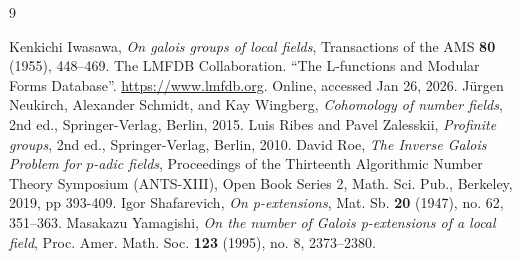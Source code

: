 \documentclass{amsart}
\begin{document}
\begin{thebibliography}{9}

 Kenkichi Iwasawa, \textit{On galois groups of local fields}, Transactions of the AMS \textbf{80} (1955), 448--469.
 The LMFDB Collaboration. ``The L-functions and Modular Forms
Database''. \url{https://www.lmfdb.org}.  Online, accessed Jan 26, 2026.
 J\"urgen Neukirch, Alexander Schmidt, and Kay Wingberg, \textit{Cohomology of number fields}, 2nd ed., Springer-Verlag, Berlin, 2015.
 Luis Ribes and Pavel Zalesskii, \textit{Profinite groups}, 2nd ed., Springer-Verlag, Berlin, 2010.
 David Roe, \textit{The Inverse Galois Problem for $p$-adic fields}, Proceedings of the Thirteenth Algorithmic Number Theory Symposium (ANTS-XIII), Open Book Series 2, Math. Sci. Pub., Berkeley, 2019, pp 393-409.
 Igor Shafarevich, \textit{On p-extensions}, Mat. Sb. \textbf{20} (1947), no. 62, 351--363.
 Masakazu Yamagishi, \textit{On the number of Galois p-extensions of a local field}, Proc. Amer.
Math. Soc. \textbf{123} (1995), no. 8, 2373--2380.

\end{thebibliography}
\end{document}
